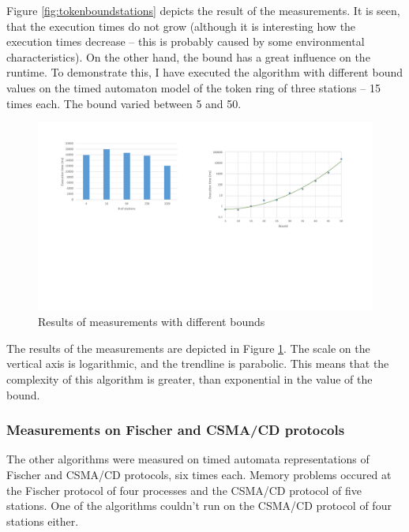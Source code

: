 Figure \ref{fig:tokenboundstations} depicts the result of the measurements. It is seen, that the execution times do not grow (although it is interesting how the execution times decrease -- this is probably caused by some environmental characteristics). On the other hand, the bound has a great influence on the runtime. To demonstrate this, I have executed the algorithm with different bound values on the timed automaton model of the token ring of three stations -- 15 times each. The bound varied between 5 and 50.

\begin{figure}
	\centering
	\includegraphics[width=\textwidth]{include/figures/diag_bound}
	\caption{Results of measurements with different bounds}
	\label{fig:tokenbound}
\end{figure}

The results of the measurements are depicted in Figure \ref{fig:tokenbound}. The scale on the vertical axis is logarithmic, and the trendline is parabolic. This means that the complexity of this algorithm is greater, than exponential in the value of the bound.

\subsubsection{Measurements on Fischer and CSMA/CD protocols}

The other algorithms were measured on timed automata representations of Fischer and CSMA/CD protocols, six times each. Memory problems occured at the Fischer protocol of four processes and the CSMA/CD protocol of five stations. One of the algorithms couldn't run on the CSMA/CD protocol of four stations either.

